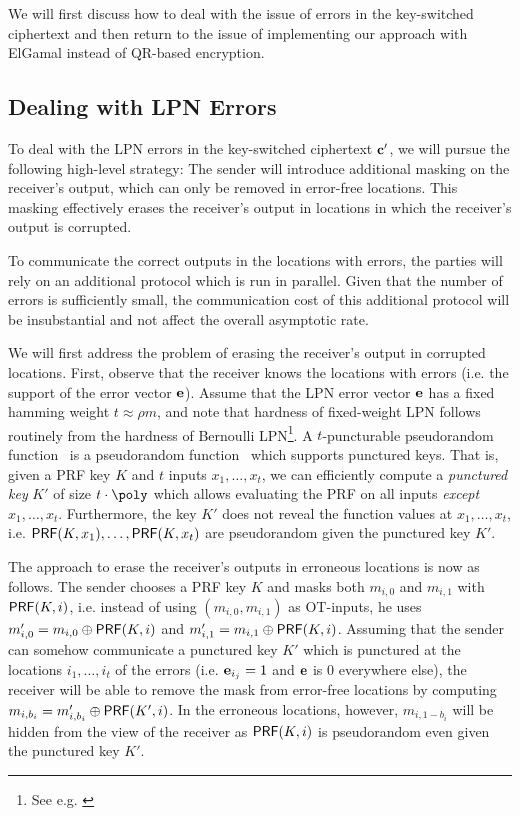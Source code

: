We will first discuss how to deal with the issue of errors in the key-switched ciphertext and then return to the issue of implementing our approach with ElGamal instead of QR-based encryption.

\subsection{Dealing with LPN Errors}

To deal with the LPN errors in the key-switched ciphertext $\mathbf{c}'$, we will pursue the following high-level strategy: The sender will introduce additional masking on the receiver's output, which can only be removed in error-free locations. This masking effectively erases the receiver's output in locations in which the receiver's output is corrupted.

To communicate the correct outputs in the locations with errors, the parties will rely on an additional protocol which is run in parallel. Given that the number of errors is sufficiently small, the communication cost of this additional protocol will be insubstantial and not affect the overall asymptotic rate.

We will first address the problem of erasing the receiver's output in corrupted locations. First, observe that the receiver knows the locations with errors (i.e. the support of the error vector $\mathbf{e}$). Assume that the LPN error vector $\mathbf{e}$ has a fixed hamming weight $t \approx \rho m$, and note that hardness of fixed-weight LPN follows routinely from the hardness of Bernoulli LPN\footnote{See e.g. \cite{PKC:Dottling15,C:BCGIKS19}}. A $t$-puncturable pseudorandom function~\cite{PKC:BoyGolIva14,C:BCGIKS19} is a pseudorandom function~\cite{C:GolGolMic84} which supports punctured keys. That is, given a PRF key $K$ and $t$ inputs $x_1,\dots,x_t$, we can efficiently compute a \emph{punctured key} $K'$ of size $t \cdot \poly$ which allows evaluating the PRF on all inputs \emph{except} $x_1,\dots,x_t$. Furthermore, the key $K'$ does not reveal the function values at $x_1,\dots,x_t$, i.e. $\mathsf{PRF}(K,x_1),\dots,\mathsf{PRF}(K,x_t)$ are pseudorandom given the punctured key $K'$. 

The approach to erase the receiver's outputs in erroneous locations is now as follows. The sender chooses a PRF key $K$ and masks both $m_{i,0}$ and $m_{i,1}$ with $\mathsf{PRF}(K,i)$, i.e. instead of using $(m_{i,0},m_{i,1})$ as OT-inputs, he uses $m'_{i,0} = m_{i,0} \oplus \mathsf{PRF}(K,i)$ and $m'_{i,1} = m_{i,1} \oplus \mathsf{PRF}(K,i)$. Assuming that the sender can somehow communicate a punctured key $K'$ which is punctured at the locations $i_1,\dots,i_t$ of the errors (i.e. $\mathbf{e}_{i_j} = 1$ and $\mathbf{e}$ is 0 everywhere else), the receiver will be able to remove the mask from error-free locations by computing $m_{i,b_i} = m'_{i,b_i} \oplus \mathsf{PRF}(K', i)$. In the erroneous locations, however, $m_{i,1-b_i}$ will be hidden from the view of the receiver as $\mathsf{PRF}(K, i)$ is pseudorandom even given the punctured key $K'$.

